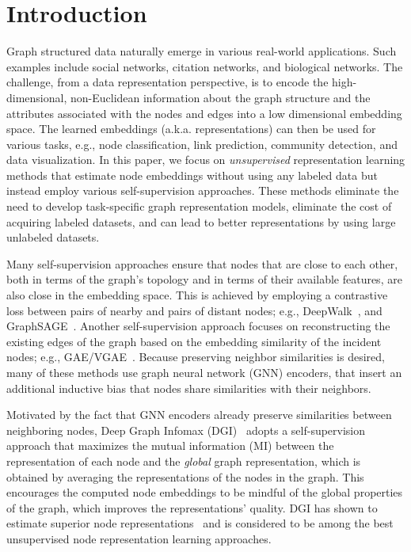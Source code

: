 \documentclass{article}
\begin{document}
\thispagestyle{empty} 

\section{Introduction}

Graph structured data naturally emerge in various real-world applications. Such examples include social networks, citation networks, and biological networks. The challenge, from a data representation perspective, is to encode the high-dimensional, non-Euclidean information about the graph structure and the attributes associated with the nodes and edges into a low dimensional embedding space. The learned embeddings (a.k.a. representations) can then be used for various tasks, e.g., node classification, link prediction, community detection, and data visualization.  
In this paper, we focus on \emph{unsupervised} representation learning methods that estimate node embeddings without using any labeled data but instead employ various self-supervision approaches. These methods eliminate the need to develop task-specific graph representation models, eliminate the cost of acquiring labeled datasets, and can lead to better representations by using large unlabeled datasets. 










Many self-supervision approaches ensure that nodes that are close to each other, both in terms of the graph's topology and in terms of their available features, are also close in the embedding space. This is achieved by employing a contrastive loss between pairs of nearby and pairs of distant nodes; e.g., DeepWalk~\cite{perozzi2014deepwalk}, and GraphSAGE~\cite{hamilton2017inductive}. 
Another self-supervision approach focuses on reconstructing the existing edges of the graph based on the embedding similarity of the incident nodes; e.g.,  GAE/VGAE~\cite{kipf2016variational}. Because preserving neighbor similarities is desired, many of these methods use graph neural network (GNN) encoders, that insert an additional inductive bias that nodes share similarities with their neighbors. 


Motivated by the fact that GNN encoders already preserve similarities between neighboring nodes, Deep Graph Infomax (DGI)~\cite{velickovic2018deep} adopts a self-supervision approach that maximizes the mutual information (MI) between the representation of each node and the \emph{global} graph representation, which is obtained by averaging the representations of the nodes in the graph. This encourages the computed node embeddings to be mindful of the global properties of the graph, which improves the representations' quality. DGI has shown to estimate superior node representations~\cite{velickovic2018deep} and is considered to be among the best unsupervised node representation learning approaches.
\end{document}
